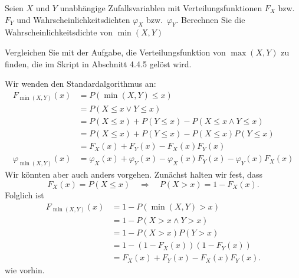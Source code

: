 Seien $X$ und $Y$  unabhängige Zufallsvariablen mit Verteilungsfunktionen
$F_X$ bzw.~$F_Y$ und Wahrscheinlichkeitsdichten $\varphi_X$ bzw.~$\varphi_Y$.
Berechnen Sie die Wahrscheinlichkeitsdichte von $\min(X,Y)$


\begin{hinweis}
Vergleichen Sie mit der Aufgabe, die Verteilungsfunktion
von $\operatorname{max}(X, Y)$ zu finden, die im Skript in Abschnitt 4.4.5
gelöst wird.
\end{hinweis}

\begin{loesung}
Wir wenden den Standardalgorithmus an:
\begin{align*}
F_{\min(X,Y)}(x)
&=
P(\min(X,Y)\le x)
\\
&=P(X\le x\vee Y\le x)
\\
&=P(X\le x) + P(Y\le x) - P(X\le x\wedge Y\le x)
\\
&=P(X\le x) + P(Y\le x) - P(X\le x)P(Y\le x)
\\
&=F_X(x)+F_Y(x)-F_X(x)F_Y(x)
\\
\varphi_{\min(X,Y)}(x)
&=
\varphi_X(x)+\varphi_Y(x)-\varphi_X(x)F_Y(x)-\varphi_Y(x)F_X(x)
\end{align*}
Wir könnten aber auch anders vorgehen. Zunächst halten wir fest,
dass
\[
F_X(x)=P(X\le x)
\quad
\Rightarrow
\quad
P(X>x)=1-F_X(x).
\]
Folglich ist
\begin{align*}
F_{\min(X,Y)}(x)
&=
1-P(\min(X,Y) > x)
\\
&=
1-P(X>x\wedge Y>x)
\\
&=1-P(X>x)P(Y>x)
\\
&=1-(1-F_X(x))(1-F_Y(x))
\\
&=
F_X(x)+F_Y(x)-F_X(x)F_Y(x).
\end{align*}
wie vorhin.
\end{loesung}

